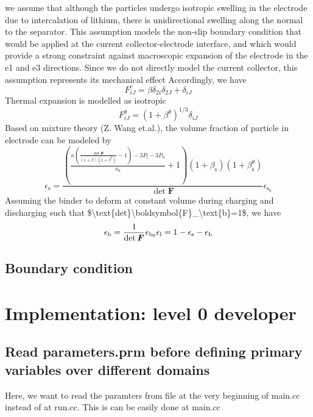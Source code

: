 we assume that although the particles undergo isotropic swelling in the electrode due to intercalation of lithium, there is unidirectional swelling along the normal to the separator. This assumption models the non-\/slip boundary condition that would be applied at the current collector-\/electrode interface, and which would provide a strong constraint against macroscopic expansion of the electrode in the e1 and e3 directions. Since we do not directly model the current collector, this assumption represents its mechanical effect Accordingly, we have \[ F^\text{c}_{iJ}=\beta\delta_{2i}\delta_{2J}+\delta_{iJ} \] Thermal expansion is modelled as isotropic \[ F^{\theta}_{iJ}=(1+\beta^{\theta})^{1/3}\delta_{iJ} \] Based on mixture theory (Z. Wang et.\+al.), the volume fraction of particle in electrode can be modeled by \[ \epsilon_\text{s}=\frac{\left( \frac{\kappa(\frac{\det\boldsymbol{F}}{(1+\beta)(1+\beta^\theta)}-1)-3P_\text{l}-3P_\text{b}}{\kappa_\text{s}} +1\right)(1+\beta_\text{s})(1+\beta_\text{s}^\theta)}{\det\boldsymbol{F}}\epsilon_{\text{s}_0} \] Assuming the binder to deform at constant volume during charging and discharging such that \$\textbackslash{}text\{det\}\textbackslash{}boldsymbol\{F\}\+\_\+\textbackslash{}text\{b\}=1\$, we have \[ \epsilon_\text{b}=\frac{1}{\det \boldsymbol{F}}\epsilon_{\text{b}_0}\\ \epsilon_\text{l}=1-\epsilon_{\text{s}}-\epsilon_\text{b} \] \hypertarget{battery_electrode_scale_sub2}{}\subsection{Boundary condition}\label{battery_electrode_scale_sub2}
 \hypertarget{battery_particle_Implementation}{}\section{Implementation\+: level 0 developer}\label{battery_particle_Implementation}
\hypertarget{battery_electrode_scale_sub1}{}\subsection{Read parameters.\+prm before defining primary variables over different domains}\label{battery_electrode_scale_sub1}
Here, we want to read the paramters from file at the very beginning of main.\+cc instead of at run.\+cc. This is can be easily done at main.\+cc 
\begin{DoxyCode}{0}
\end{DoxyCode}
